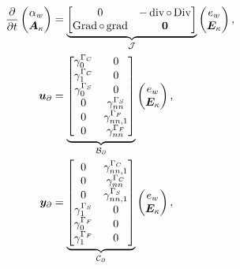 \begin{equation}\label{eq:phsysKir}
\begin{aligned}
\displaystyle
\diffp{}{t}
\begin{pmatrix}
\alpha_w \\
\bm{A}_{\kappa} \\
\end{pmatrix} &= 
\underbrace{\begin{bmatrix}
	0  &  - \div \circ \Div \\
\Grad \circ \grad & \bm{0} \\
\end{bmatrix}}_{\mathcal{J}}
\begin{pmatrix}
e_w \\
\bm{E}_{\kappa} \\
\end{pmatrix}, \vspace{3pt}\\
\bm{u}_\partial &= \underbrace{
	\begin{bmatrix}
	\gamma_{0}^{\Gamma_C} & {0}  \\
	\gamma_1^{\Gamma_C} &  {0} \\
	\gamma_{0}^{\Gamma_S} &  {0}  \\
	{0} & \gamma_{nn}^{\Gamma_S} \\
	{0} & \gamma_{nn, 1}^{\Gamma_F}  \\
	{0} & \gamma_{nn}^{\Gamma_F}\\
	\end{bmatrix}}_{\mathcal{B}_\partial} \begin{pmatrix}
e_w \\
\bm{E}_{\kappa} \\
\end{pmatrix}, \vspace{3pt}\\
\bm{y}_\partial &= \underbrace{
	\begin{bmatrix}
	{0} & \gamma_{nn, 1}^{\Gamma_C} \\
	{0} & \gamma_{nn}^{\Gamma_C} \\
	{0} & \gamma_{nn, 1}^{\Gamma_S} \\
	\gamma_{1}^{\Gamma_S} & {0} \\
	\gamma_{0}^{\Gamma_F} & {0} \\
	\gamma_{1}^{\Gamma_F} & {0} \\
	\end{bmatrix}}_{\mathcal{C}_\partial}
\begin{pmatrix}
e_w \\
\bm{E}_{\kappa} \\
\end{pmatrix},
\end{aligned}
\end{equation}
